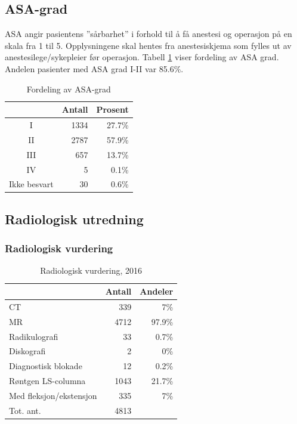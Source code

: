 \documentclass [norsk,a4paper,twoside]{article}\usepackage[]{graphicx}\usepackage[]{color}
\begin{document}
\subsection{ASA-grad}
ASA angir pasientens ”sårbarhet” i forhold til å få anestesi og operasjon på en skala fra 1 til 5. 
Opplysningene skal hentes fra anestesiskjema som fylles ut av anestesilege/sykepleier før operasjon.
Tabell \ref{tab:ASA} viser fordeling av ASA grad. Andelen pasienter med ASA grad I-II 
var 85.6\%. 


\begin{table}[ht]
\centering
\begin{tabular}{crr}
  \hline
 & Antall & Prosent \\ 
  \hline
I & 1334 & 27.7\% \\ 
  II & 2787 & 57.9\% \\ 
  III & 657 & 13.7\% \\ 
  IV & 5 & 0.1\% \\ 
  Ikke besvart & 30 & 0.6\% \\ 
   \hline
\end{tabular}
\caption{Fordeling av ASA-grad} 
\label{tab:ASA}
\end{table}




\subsection{Radiologisk utredning}
\subsubsection{Radiologisk vurdering}

\begin{table}[ht]
\centering
\begin{tabular}{lrr}
  \hline
 & Antall & Andeler \\ 
  \hline
CT & 339 & 7\% \\ 
  MR & 4712 & 97.9\% \\ 
  Radikulografi & 33 & 0.7\% \\ 
  Diskografi & 2 & 0\% \\ 
  Diagnostisk blokade & 12 & 0.2\% \\ 
  Røntgen LS-columna & 1043 & 21.7\% \\ 
  Med fleksjon/ekstensjon & 335 & 7\% \\ 
  Tot. ant. & 4813 &   \\ 
   \hline
\end{tabular}
\caption{Radiologisk vurdering, 2016} 
\label{tab:RV}
\end{table}
\end{document}

